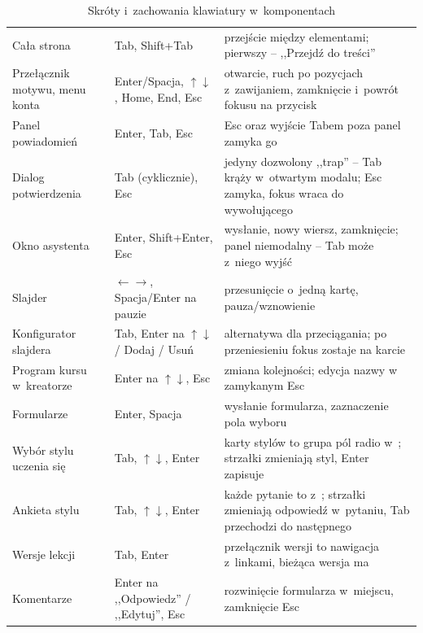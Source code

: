 \begin{table}[H]
\centering\small
\caption{Skróty i~zachowania klawiatury w~komponentach}
\begin{tabularx}{\linewidth}{@{}P{3.8cm}P{3.6cm}L@{}}
\toprule
{} &  &  \\
\midrule
Cała strona & Tab, Shift+Tab & przejście między elementami; pierwszy -- ,,Przejdź do treści'' \\
Przełącznik motywu, menu konta & Enter/Spacja, $\uparrow\downarrow$, Home, End, Esc & otwarcie, ruch po pozycjach z~zawijaniem, zamknięcie i~powrót fokusu na przycisk \\
Panel powiadomień & Enter, Tab, Esc & Esc oraz wyjście Tabem poza panel zamyka go \\
Dialog potwierdzenia & Tab (cyklicznie), Esc & jedyny dozwolony ,,trap'' -- Tab krąży w~otwartym modalu; Esc zamyka, fokus wraca do wywołującego \\
Okno asystenta & Enter, Shift+Enter, Esc & wysłanie, nowy wiersz, zamknięcie; panel niemodalny -- Tab może z~niego wyjść \\
Slajder & $\leftarrow\rightarrow$, Spacja/Enter na pauzie & przesunięcie o~jedną kartę, pauza/wznowienie \\
Konfigurator slajdera & Tab, Enter na $\uparrow\downarrow$ / Dodaj / Usuń & alternatywa dla przeciągania; po przeniesieniu fokus zostaje na karcie \\
Program kursu w~kreatorze & Enter na $\uparrow\downarrow$, Esc & zmiana kolejności; edycja nazwy w~ zamykanym Esc \\
Formularze & Enter, Spacja & wysłanie formularza, zaznaczenie pola wyboru \\
Wybór stylu uczenia się & Tab, $\uparrow\downarrow$, Enter & karty stylów to grupa pól radio w~; strzałki zmieniają styl, Enter zapisuje \\
Ankieta stylu & Tab, $\uparrow\downarrow$, Enter & każde pytanie to  z~; strzałki zmieniają odpowiedź w~pytaniu, Tab przechodzi do następnego \\
Wersje lekcji & Tab, Enter & przełącznik wersji to nawigacja z~linkami, bieżąca wersja ma  \\
Komentarze & Enter na ,,Odpowiedz'' / ,,Edytuj'', Esc & rozwinięcie formularza w~miejscu, zamknięcie Esc \\
\bottomrule
\end{tabularx}
\end{table}

